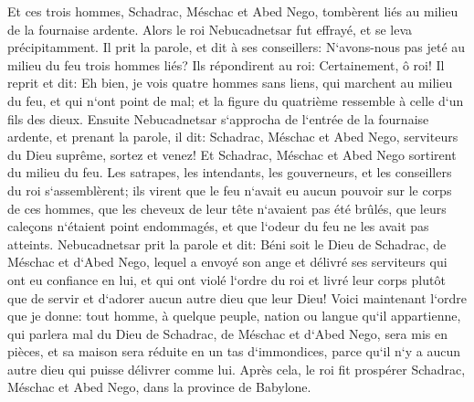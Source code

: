 \verse Et ces trois hommes, Schadrac, Méschac et Abed Nego, tombèrent liés au milieu de la fournaise ardente. 
\verse Alors le roi Nebucadnetsar fut effrayé, et se leva précipitamment. Il prit la parole, et dit à ses conseillers: N`avons-nous pas jeté au milieu du feu trois hommes liés? Ils répondirent au roi: Certainement, ô roi! 
\verse Il reprit et dit: Eh bien, je vois quatre hommes sans liens, qui marchent au milieu du feu, et qui n`ont point de mal; et la figure du quatrième ressemble à celle d`un fils des dieux. 
\verse Ensuite Nebucadnetsar s`approcha de l`entrée de la fournaise ardente, et prenant la parole, il dit: Schadrac, Méschac et Abed Nego, serviteurs du Dieu suprême, sortez et venez! Et Schadrac, Méschac et Abed Nego sortirent du milieu du feu. 
\verse Les satrapes, les intendants, les gouverneurs, et les conseillers du roi s`assemblèrent; ils virent que le feu n`avait eu aucun pouvoir sur le corps de ces hommes, que les cheveux de leur tête n`avaient pas été brûlés, que leurs caleçons n`étaient point endommagés, et que l`odeur du feu ne les avait pas atteints. 
\verse Nebucadnetsar prit la parole et dit: Béni soit le Dieu de Schadrac, de Méschac et d`Abed Nego, lequel a envoyé son ange et délivré ses serviteurs qui ont eu confiance en lui, et qui ont violé l`ordre du roi et livré leur corps plutôt que de servir et d`adorer aucun autre dieu que leur Dieu! 
\verse Voici maintenant l`ordre que je donne: tout homme, à quelque peuple, nation ou langue qu`il appartienne, qui parlera mal du Dieu de Schadrac, de Méschac et d`Abed Nego, sera mis en pièces, et sa maison sera réduite en un tas d`immondices, parce qu`il n`y a aucun autre dieu qui puisse délivrer comme lui. 
\verse Après cela, le roi fit prospérer Schadrac, Méschac et Abed Nego, dans la province de Babylone. 

